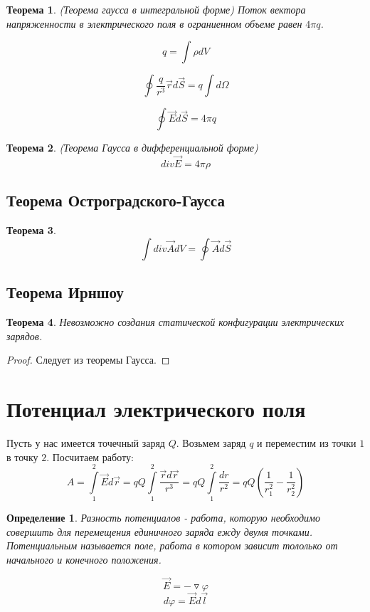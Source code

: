 \documentclass{article}
\newtheorem*{df}{Определение}
\newtheorem{teo}{Теорема}
\newcommand{\lb}{\left(}
\newcommand{\rb}{\right)}
\begin{document}
    \begin{teo}(Теорема гаусса в интегральной форме) Поток вектора напряженности в электрического поля в ограниенном объеме равен $ 4\pi q $.
  
    $$ q = \int \rho dV $$
  
    $$ \oint \frac{q}{r^3} \overrightarrow{r} d\overrightarrow{S} = q\int d\Omega $$
    
    $$ \boxed{\oint \overrightarrow{E} d\overrightarrow{S} = 4\pi q} $$
    \end{teo}
    \begin{teo}{(Теорема Гаусса в дифференциальной форме)}
    $$ \boxed{div \overrightarrow{E} = 4\pi \rho} $$
    \end{teo}
    
    
    \subsection*{Теорема Остроградского-Гаусса}
    \begin{teo}
    $$ \int div \overrightarrow{A} dV = \oint \overrightarrow{A}d\overrightarrow{S} $$ 
    \end{teo}
    
    \subsection*{Теорема Ирншоу}
    \begin{teo}
    Невозможно создания статической конфигурации электрических зарядов. 
    \end{teo}
    \begin{proof}
    Следует из теоремы Гаусса.
    \end{proof}  
    \section*{Потенциал электрического поля}
    Пусть у нас имеется точечный заряд $Q$. Возьмем заряд $q$ и переместим из точки $1$ в точку $2$. Посчитаем работу:
    $$ A = \int\limits_1^2 \overrightarrow{E}d\overrightarrow{r} = qQ\int\limits_1^2 \frac{\overrightarrow{r}d\overrightarrow{r}}{r^3} = qQ\int\limits_1^2 \frac{dr}{r^2} = qQ\lb \frac{1}{r_1^2} - \frac{1}{r_2^2} \rb $$
    \begin{df}
    Разность потенциалов - работа, которую необходимо совершить  для перемещения единичного заряда ежду двумя точками. Потенциальным называется поле, работа в котором зависит тололько от начального и конечного положения.
    \end{df}
    $$ \overrightarrow{E} = -\triangledown \varphi $$
    $$ d\varphi = \overrightarrow{E}d\overrightarrow{l} $$
    
\end{document}
